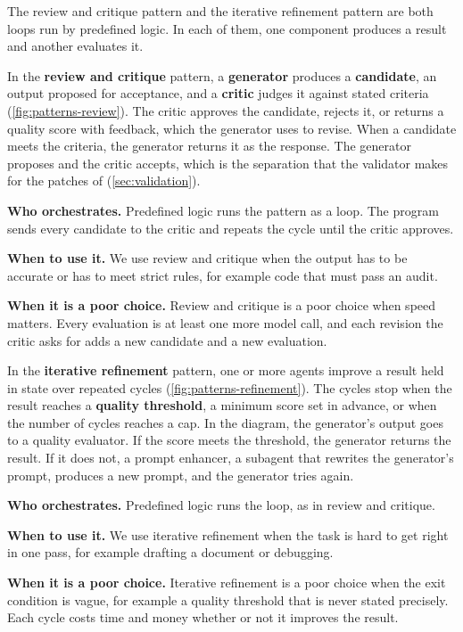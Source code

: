 The review and critique pattern and the iterative refinement pattern are both loops run by
predefined logic. In each of them, one component produces a result and another evaluates it.

In the \textbf{review and critique} pattern, a \textbf{generator} produces a \textbf{candidate}, an
output proposed for acceptance, and a \textbf{critic} judges it against stated criteria
(\cref{fig:patterns-review}). The critic approves the candidate, rejects it, or returns a quality
score with feedback, which the generator uses to revise. When a candidate meets the criteria, the
generator returns it as the response. The generator proposes and the critic accepts, which is the
separation that the validator makes for the patches of \msa{} (\cref{sec:validation}).
\bi
\item \textbf{Who orchestrates.} Predefined logic runs the pattern as a loop. The program sends
every candidate to the critic and repeats the cycle until the critic approves.
\item \textbf{When to use it.} We use review and critique when the output has to be accurate or has
to meet strict rules, for example code that must pass an audit.
\item \textbf{When it is a poor choice.} Review and critique is a poor choice when speed matters.
Every evaluation is at least one more model call, and each revision the critic asks for adds a new
candidate and a new evaluation.
\ei

In the \textbf{iterative refinement} pattern, one or more agents improve a result held in state over
repeated cycles (\cref{fig:patterns-refinement}). The cycles stop when the result reaches a
\textbf{quality threshold}, a minimum score set in advance, or when the number of cycles reaches a
cap. In the diagram, the generator's output goes to a quality evaluator. If the score meets the
threshold, the generator returns the result. If it does not, a prompt enhancer, a subagent that
rewrites the generator's prompt, produces a new prompt, and the generator tries again.
\bi
\item \textbf{Who orchestrates.} Predefined logic runs the loop, as in review and critique.
\item \textbf{When to use it.} We use iterative refinement when the task is hard to get right in one
pass, for example drafting a document or debugging.
\item \textbf{When it is a poor choice.} Iterative refinement is a poor choice when the exit
condition is vague, for example a quality threshold that is never stated precisely. Each cycle
costs time and money whether or not it improves the result.
\ei

